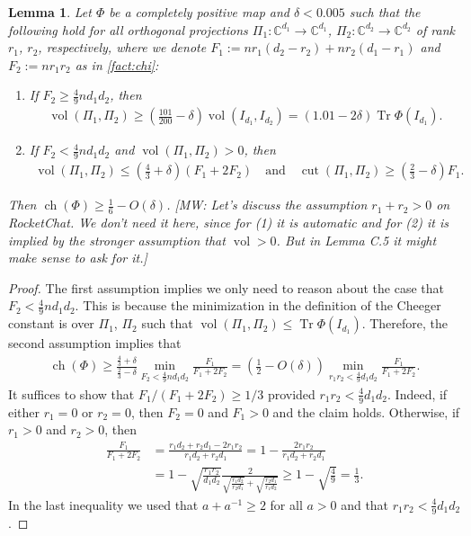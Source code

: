 \documentclass[aos]{imsart}
\newtheorem{lemma}[theorem]{Lemma}
\theoremstyle{definition}
\numberwithin{equation}{section}
\DeclareMathOperator{\vol}{vol}
\DeclareMathOperator{\cut}{cut}
\DeclareMathOperator{\ch}{ch}
\DeclareMathOperator{\tr}{Tr}
\newcommand{\C}{{\mathbb{C}}}
\newcommand{\MW}[1]{{\color{red}[MW: #1]}}
\newcommand{\MW}[1]{{}}
\begin{document}
\begin{appendix}
\begin{lemma}\label{lem:suff}
Let $\Phi$ be a completely positive map and $\delta<0.005$ such that the following hold for all orthogonal projections $\Pi_1\colon \C^{d_1} \to \C^{d_1}$, $\Pi_2 \colon \C^{d_2}\to\C^{d_2}$ of rank $r_1$, $r_2$, respectively, where we denote $F_1 := n r_1(d_2 - r_2) + n r_2(d_1-r_1)$ and $F_2 := n r_1 r_2$ as in \cref{fact:chi}:
\begin{enumerate}
\item If $F_2 \geq \frac49 n d_1 d_2$, then
\begin{align}\label{eq:vol}
  \vol(\Pi_1, \Pi_2)
\geq \left(\frac{101}{200} - \delta\right) \vol(I_{d_1}, I_{d_2})
= \left(1.01 - 2\delta\right) \tr \Phi(I_{d_1}).
\end{align}
\item If $F_2 < \frac49 n d_1 d_2$ and $\vol(\Pi_1, \Pi_2)>0$, then
\begin{align}\label{eq:cut}
  \vol(\Pi_1, \Pi_2) \leq \left(\frac43 + \delta\right)\left(F_1 + 2 F_2\right) \quad\text{and}\quad
  \cut(\Pi_1, \Pi_2) \geq \left(\frac23 - \delta\right) F_1.
\end{align}
\end{enumerate}
Then $\ch(\Phi) \geq \frac16 - O(\delta)$.
\MW{Let's discuss the assumption $r_1 + r_2 > 0$ on RocketChat. We don't need it here, since for (1) it is automatic and for (2) it is implied by the stronger assumption that $\vol>0$. But in Lemma C.5 it might make sense to ask for it.}
\end{lemma}
\begin{proof}
The first assumption implies we only need to reason about the case that $F_2 < \frac49 n d_1 d_2$.
This is because the minimization in the definition of the Cheeger constant is over $\Pi_1$, $\Pi_2$ such that $\vol(\Pi_1, \Pi_2) \leq \tr \Phi(I_{d_1})$.
Therefore, the second assumption implies that
\begin{align*}
  \ch(\Phi)
\geq \frac{\frac43 + \delta}{\frac23 - \delta} \min_{F_2 < \frac49 n d_1 d_2} \frac{F_1}{F_1 + 2 F_2}
= \left( \frac12 - O(\delta) \right) \min_{r_1 r_2 < \frac49 d_1 d_2} \frac{F_1}{F_1 + 2 F_2}.
\end{align*}
It suffices to show that $F_1/(F_1 + 2 F_2) \geq 1/3$ provided $r_1 r_2 < \frac49 d_1 d_2$.
Indeed, if either $r_1 = 0$ or $r_2 = 0$, then $F_2 = 0$ and $F_1>0$ and the claim holds.
Otherwise, if $r_1>0$ and $r_2>0$, then
\begin{align*}
  \frac{F_1}{F_1 + 2 F_2}
&= \frac{r_1 d_2 + r_2 d_1 - 2 r_1 r_2}{r_1 d_2 + r_2 d_1}
= 1 - \frac{2 r_1 r_2}{r_1 d_2 + r_2 d_1} \\
&= 1 - \sqrt{\frac{r_1r_2}{d_1d_2}} \frac2{\sqrt{\frac{r_1 d_2}{r_2 d_1}} + \sqrt{\frac{r_2 d_1}{r_1 d_2}}}
\geq 1 - \sqrt{\frac49}
= \frac13.
\end{align*}
In the last inequality we used that $a + a^{-1} \geq 2$ for all $a>0$ and that $r_1 r_2 < \frac49 d_1 d_2$.
\end{proof}


\end{appendix}
\end{document}
